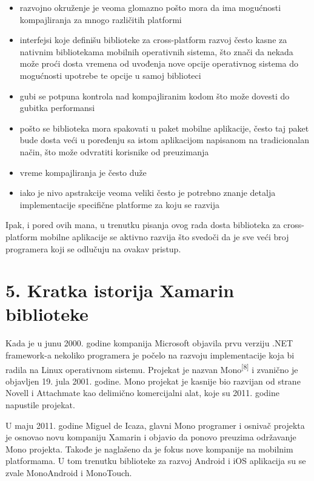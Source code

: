 \documentclass[a4paper]{article}
\newcommand\liststyleLiv{%
\renewcommand\labelitemi{•}
\renewcommand\labelitemii{◦}
\renewcommand\labelitemiii{${\blacksquare}$}
\renewcommand\labelitemiv{•}
}
\begin{document}
\liststyleLiv
\begin{itemize}
\item razvojno okruženje je veoma glomazno pošto mora da ima mogućnosti
kompajliranja za mnogo različitih platformi
\item interfejsi koje definišu biblioteke za cross-platform razvoj često
kasne za nativnim bibliotekama mobilnih operativnih sistema, što znači
da nekada može proći dosta vremena od uvođenja nove opcije operativnog
sistema do mogućnosti upotrebe te opcije u samoj biblioteci
\item gubi se potpuna kontrola nad kompajliranim kodom što može dovesti
do gubitka performansi
\item pošto se biblioteka mora spakovati u paket mobilne aplikacije,
često taj paket bude dosta veći u poređenju sa istom aplikacijom
napisanom na tradicionalan način, što može odvratiti korisnike od
preuzimanja
\item vreme kompajliranja je često duže
\item iako je nivo apstrakcije veoma veliki često je potrebno znanje
detalja implementacije specifične platforme za koju se razvija
\end{itemize}
Ipak, i pored ovih mana, u trenutku pisanja ovog rada dosta biblioteka
za cross-platform mobilne aplikacije se aktivno razvija što svedoči da
je sve veći broj programera koji se odlučuju na ovakav pristup.

\section[5. Kratka istorija Xamarin biblioteke]{5. Kratka istorija
Xamarin biblioteke}
\hypertarget{RefHeadingToc4191813786090}{}Kada je u junu 2000. godine
kompanija Microsoft objavila prvu verziju .NET framework-a nekoliko
programera je počelo na razvoju implementacije koja bi radila na Linux
operativnom sistemu. Projekat je nazvan Mono\textsuperscript{[8]} i
zvanično je objavljen 19. jula 2001. godine. Mono projekat je kasnije
bio razvijan od strane Novell i Attachmate kao delimično komercijalni
alat, koje su 2011. godine napustile projekat.

U maju 2011. godine Miguel de Icaza, glavni Mono programer i osnivač
projekta je osnovao novu kompaniju Xamarin i objavio da ponovo preuzima
održavanje Mono projekta. Takođe je naglašeno da je fokus nove
kompanije na mobilnim platformama. U tom trenutku biblioteke za razvoj
Android i iOS aplikacija su se zvale MonoAndroid i MonoTouch.
\end{document}
